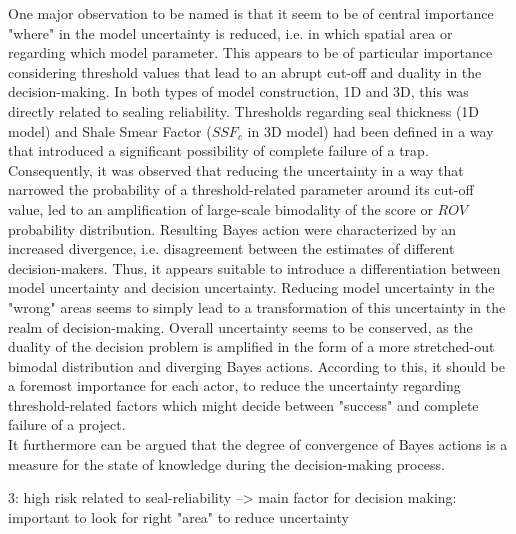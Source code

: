 	One major observation to be named is that it seem to be of central importance "where" in the model uncertainty is reduced, i.e. in which spatial area or regarding which model parameter. This appears to be of particular importance considering threshold values that lead to an abrupt cut-off and duality in the decision-making. In both types of model construction, 1D and 3D, this was directly related to sealing reliability. Thresholds regarding seal thickness (1D model) and Shale Smear Factor ($SSF_c$ in 3D model) had been defined in a way that introduced a significant possibility of complete failure of a trap. Consequently, it was observed that reducing the uncertainty in a way that narrowed the probability of a threshold-related parameter around its cut-off value, led to an amplification of large-scale bimodality of the score or $ROV$ probability distribution. Resulting Bayes action were characterized by an increased divergence, i.e. disagreement between the estimates of different decision-makers. Thus, it appears suitable to introduce a differentiation between model uncertainty and decision uncertainty. Reducing model uncertainty in the "wrong" areas seems to simply lead to a transformation of this uncertainty in the realm of decision-making. Overall uncertainty seems to be conserved, as the duality of the decision problem is amplified in the form of a more stretched-out bimodal distribution and diverging Bayes actions. According to this, it should be a foremost importance for each actor, to reduce the uncertainty regarding threshold-related factors which might decide between "success" and complete failure of a project.\\
	It furthermore can be argued that the degree of convergence of Bayes actions is a measure for the state of knowledge during the decision-making process.  
	
	3: high risk related to seal-reliability --> main factor for decision making: important to look for right "area" to reduce uncertainty
	
